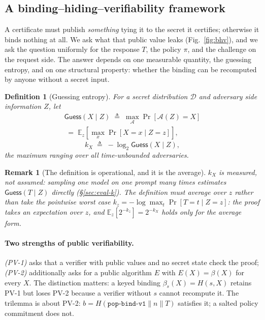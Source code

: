 \documentclass[10pt,journal,compsoc]{IEEEtran}
\newtheorem{definition}[theorem]{Definition}
\newtheorem{remark}[theorem]{Remark}
\begin{document}
\subsection{A binding--hiding--verifiability framework}
\label{sec:tradeoff}

A certificate must publish \emph{something} tying it to the secret it certifies;
otherwise it binds nothing at all. We ask what that public value leaks (Fig.~\ref{fig:bhv}), and we
ask the question uniformly for the response $T$, the policy $\pi$, and the
challenge on the request side. The answer depends on one measurable quantity,
the guessing entropy, and on one structural property: whether the binding can be
recomputed by anyone without a secret input.

\begin{definition}[Guessing entropy]
\label{def:k}
For a secret distribution $\mathcal{D}$ and adversary side information $Z$, let
\begin{multline*}
\mathsf{Guess}(X \mid Z) \;\triangleq\; \max_{\mathcal{A}} \Pr[\mathcal{A}(Z) = X]\\
\;=\; \mathbb{E}_z\!\left[\max_x \Pr[X = x \mid Z = z]\right],
\end{multline*}
\[
k_X \;\triangleq\; -\log_2 \mathsf{Guess}(X \mid Z),
\]
the maximum ranging over all time-unbounded adversaries.
\end{definition}

\begin{remark}[The definition is operational, and it is the average]
\label{rem:kmeas}
$k_X$ is \emph{measured}, not assumed: sampling one model on one prompt many
times estimates $\mathsf{Guess}(T \mid Z)$ directly (\S\ref{sec:eval-k}). The
definition must average over $z$ rather than take the pointwise worst case
$k_z = -\log \max_t \Pr[T = t \mid Z = z]$: the proof takes an expectation over
$z$, and $\mathbb{E}_z[2^{-k_z}] = 2^{-k_X}$ holds only for the average form.
\end{remark}

\paragraph{Two strengths of public verifiability.} \emph{(PV-1)} asks that a
verifier with public values and no secret state check the proof; \emph{(PV-2)}
additionally asks for a public algorithm $E$ with $E(X)=\beta(X)$ for every
$X$. The distinction matters: a keyed binding $\beta_s(X)=H(s,X)$ retains PV-1
but loses PV-2 because a verifier without $s$ cannot recompute it. The trilemma
is about PV-2: $b=H(\texttt{pop-bind-v1}\|n\|T)$ satisfies it; a salted policy
commitment does not.
\end{document}

